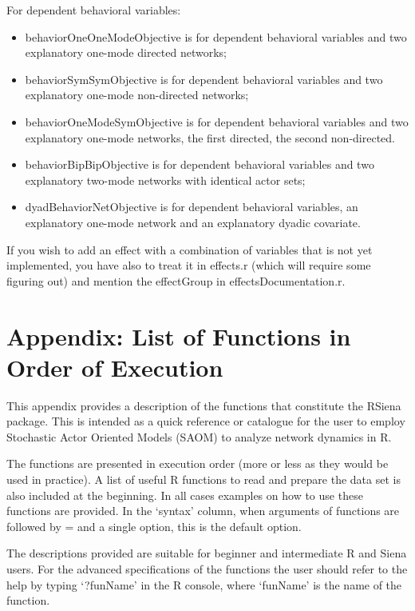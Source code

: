 \documentclass[a4paper,fleqn,11pt]{article}
\newcommand{\+}{\, + \,}
\newcommand{\sfn}[1]{\textsf{#1}}
\newcommand{\R}{{\sf R }}
\newcommand{\Rn}{{\sf R}}
\newcommand{\RS}{{\sf \textsf{RSiena} }}
\begin{document}
\noindent
For dependent behavioral variables:
\begin{itemize}
\item \sfn{behaviorOneOneModeObjective} is for dependent behavioral variables and
    two explanatory one-mode directed networks;
\item \sfn{behaviorSymSymObjective} is for dependent behavioral variables and
    two explanatory one-mode non-directed networks;
\item \sfn{behaviorOneModeSymObjective} is for dependent behavioral variables and
    two explanatory one-mode networks, the first directed, the second non-directed.
\item \sfn{behaviorBipBipObjective} is for dependent behavioral variables and
    two explanatory two-mode networks with identical actor sets;
\item \sfn{dyadBehaviorNetObjective} is for dependent behavioral variables,
   an explanatory one-mode network and an explanatory dyadic covariate.
\end{itemize}

If you wish to add an effect with a combination of variables that is not yet implemented,
you have also to treat it in \sfn{effects.r} (which will require some figuring out) and
mention the effectGroup in \sfn{effectsDocumentation.r}.


\appendix
\newpage
\section{Appendix: List of Functions in Order of Execution}

    This appendix
    provides a description of the functions that constitute the
    \RS package. This is intended as a quick reference or catalogue for the
    user to employ Stochastic Actor Oriented Models (SAOM) to analyze network
    dynamics in \Rn.

    The functions are presented in execution order (more or less as
    they would be used in practice). A list of useful \R
    functions to read and prepare the data set is also included at the
    beginning. In all cases examples on how to use these functions are provided.
    In the `syntax' column,
    when arguments of functions are followed by = and a single option,
    this is the default option.

    The descriptions provided are suitable for beginner and intermediate \R and
    Siena users. For the advanced specifications of the functions the user
    should refer to the help by typing `?funName' in the \R console, where
    `funName' is the name of the function.
\end{document}
